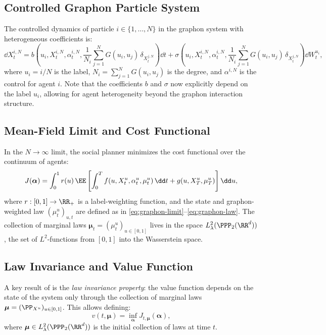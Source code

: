 \documentclass[11pt]{article}
\begin{document}
\subsection{Controlled Graphon Particle System}

The controlled dynamics of particle $i \in \{1, \ldots, N\}$ in the graphon system with heterogeneous coefficients is:
\begin{equation}\label{eq:nonexch-particle}
  \dd X_t^{i,N} = b\!\left(u_i, X_t^{i,N}, \alpha_t^{i,N}, \frac{1}{N_i}\sum_{j=1}^N G(u_i, u_j)\,\delta_{X_t^{j,N}}\right)\dd t + \sigma\!\left(u_i, X_t^{i,N}, \alpha_t^{i,N}, \frac{1}{N_i}\sum_{j=1}^N G(u_i, u_j)\,\delta_{X_t^{j,N}}\right)\dd W_t^{u_i},
\end{equation}
where $u_i = i/N$ is the label, $N_i = \sum_{j=1}^N G(u_i, u_j)$ is the degree, and $\alpha^{i,N}$ is the control for agent $i$. Note that the coefficients $b$ and $\sigma$ now explicitly depend on the label $u_i$, allowing for agent heterogeneity beyond the graphon interaction structure.

\subsection{Mean-Field Limit and Cost Functional}

In the $N \to \infty$ limit, the social planner minimizes the cost functional over the continuum of agents:
\begin{equation}\label{eq:nonexch-cost}
  J(\boldsymbol{\alpha}) = \int_0^1 r(u)\,\EE\left[\int_0^T f\!\left(u, X_t^u, \alpha_t^u, \mu_t^u\right)\dd t + g\!\left(u, X_T^u, \mu_T^u\right)\right]\dd u,
\end{equation}
where $r : [0,1] \to \RR_+$ is a label-weighting function, and the state and graphon-weighted law $(\mu_t^u)_{u,t}$ are defined as in \eqref{eq:graphon-limit}--\eqref{eq:graphon-law}. The collection of marginal laws $\boldsymbol{\mu}_t = (\mu_t^u)_{u \in [0,1]}$ lives in the space $L^2_\lambda(\PPP_2(\RR^d))$, the set of $L^2$-functions from $[0,1]$ into the Wasserstein space.

\subsection{Law Invariance and Value Function}

A key result of \citet{decrescenzo2026mfc} is the \emph{law invariance property}: the value function depends on the state of the system only through the collection of marginal laws $\boldsymbol{\mu} = (\PP_{X^u})_{u \in [0,1]}$. This allows defining:
\begin{equation}\label{eq:nonexch-value}
  v(t, \boldsymbol{\mu}) = \inf_{\boldsymbol{\alpha}} J_{t,\boldsymbol{\mu}}(\boldsymbol{\alpha}),
\end{equation}
where $\boldsymbol{\mu} \in L^2_\lambda(\PPP_2(\RR^d))$ is the initial collection of laws at time $t$.
\end{document}
